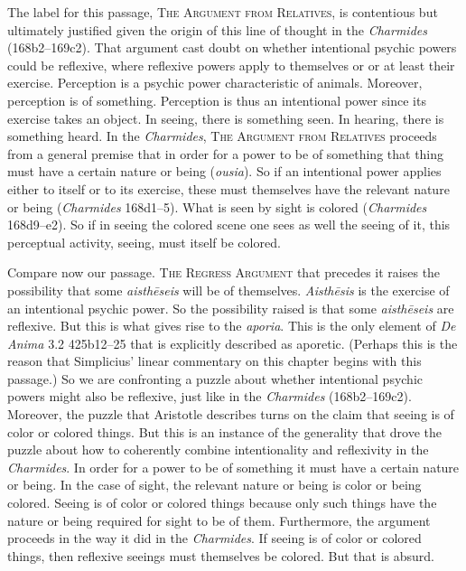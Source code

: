 The label for this passage, \textsc{The Argument from Relatives}, is contentious but ultimately justified given the origin of this line of thought in the \emph{Charmides} (168b2–169c2). That argument cast doubt on whether intentional psychic powers could be reflexive, where reflexive powers apply to themselves or or at least their exercise. Perception is a psychic power characteristic of animals. Moreover, perception is of something. Perception is thus an intentional power since its exercise takes an object. In seeing, there is something seen. In hearing, there is something heard. In the \emph{Charmides}, \textsc{The Argument from Relatives} proceeds from a general premise that in order for a power to be of something that thing must have a certain nature or being (\emph{ousia}). So if an intentional power applies either to itself or to its exercise, these must themselves have the relevant nature or being (\emph{Charmides} 168d1–5). What is seen by sight is colored (\emph{Charmides} 168d9–e2). So if in seeing the colored scene one sees as well the seeing of it, this perceptual activity, seeing, must itself be colored.

Compare now our passage. \textsc{The Regress Argument} that precedes it raises the possibility that some \emph{aisthēseis} will be of themselves. \emph{Aisthēsis} is the exercise of an intentional psychic power. So the possibility raised is that some \emph{aisthēseis} are reflexive. But this is what gives rise to the \emph{aporia}. This is the only element of \emph{De Anima} 3.2 425b12–25 that is explicitly described as aporetic. (Perhaps this is the reason that Simplicius' linear commentary on this chapter begins with this passage.) So we are confronting a puzzle about whether intentional psychic powers might also be reflexive, just like in the \emph{Charmides} (168b2–169c2). Moreover, the puzzle that Aristotle describes turns on the claim that seeing is of color or colored things. But this is an instance of the generality that drove the puzzle about how to coherently combine intentionality and reflexivity in the \emph{Charmides}. In order for a power to be of something it must have a certain nature or being. In the case of sight, the relevant nature or being is color or being colored. Seeing is of color or colored things because only such things have the nature or being required for sight to be of them. Furthermore, the argument proceeds in the way it did in the \emph{Charmides}. If seeing is of color or colored things, then reflexive seeings must themselves be colored. But that is absurd.

